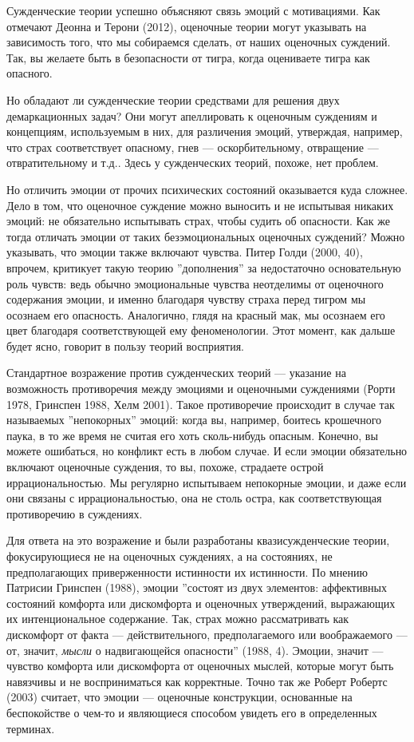\documentclass[11pt]{book}
\begin{document}
Сужденческие теории успешно объясняют связь эмоций с мотивациями. Как отмечают Деонна и Терони (2012), оценочные теории могут указывать на зависимость того, что мы собираемся сделать, от наших оценочных суждений. Так, вы желаете быть в безопасности от тигра, когда оцениваете тигра как опасного.

Но обладают ли сужденческие теории средствами для решения двух демаркационных задач? Они могут апеллировать к оценочным суждениям и концепциям, используемым в них, для различения эмоций, утверждая, например, что страх соответствует опасному, гнев --- оскорбительному, отвращение --- отвратительному и т.д.. Здесь у сужденческих теорий, похоже, нет проблем.

Но отличить эмоции от прочих психических состояний оказывается куда сложнее. Дело в том, что оценочное суждение можно выносить и не испытывая никаких эмоций: не обязательно испытывать страх, чтобы судить об опасности. Как же тогда отличать эмоции от таких безэмоциональных оценочных суждений? Можно указывать, что эмоции также включают чувства. Питер Голди (2000, 40), впрочем, критикует такую теорию ''дополнения'' за недостаточно основательную роль чувств: ведь обычно эмоциональные чувства неотделимы от оценочного содержания эмоции, и именно благодаря чувству страха перед тигром мы осознаем его опасность. Аналогично, глядя на красный мак, мы осознаем его цвет благодаря соответствующей ему феноменологии. Этот момент, как дальше будет ясно, говорит в пользу теорий восприятия.

Стандартное возражение против сужденческих теорий --- указание на возможность противоречия между эмоциями и оценочными суждениями (Рорти 1978, Гринспен 1988, Хелм 2001). Такое противоречие происходит в случае так называемых ''непокорных'' эмоций: когда вы, например, боитесь крошечного паука, в то же время не считая его хоть сколь-нибудь опасным. Конечно, вы можете ошибаться, но конфликт есть в любом случае. И если эмоции обязательно включают оценочные суждения, то вы, похоже, страдаете острой иррациональностью. Мы регулярно испытываем непокорные эмоции, и даже если они связаны с иррациональностью, она не столь остра, как соответствующая противоречию в суждениях.

Для ответа на это возражение и были разработаны квазисужденческие теории, фокусирующиеся не на оценочных суждениях, а на состояниях, не предполагающих приверженности истинности их истинности. По мнению Патрисии Гринспен (1988), эмоции ''состоят из двух элементов: аффективных состояний комфорта или дискомфорта и оценочных утверждений, выражающих их интенциональное содержание. Так, страх можно рассматривать как дискомфорт от факта --- действительного, предполагаемого или воображаемого --- от, значит, \textit{мысли} о надвигающейся опасности'' (1988, 4). Эмоции, значит --- чувство комфорта или дискомфорта от оценочных мыслей, которые могут быть навязчивы и не восприниматься как корректные. Точно так же Роберт Робертс (2003) считает, что эмоции --- оценочные конструкции, основанные на беспокойстве о чем-то и являющиеся способом увидеть его в определенных терминах.
\end{document}
